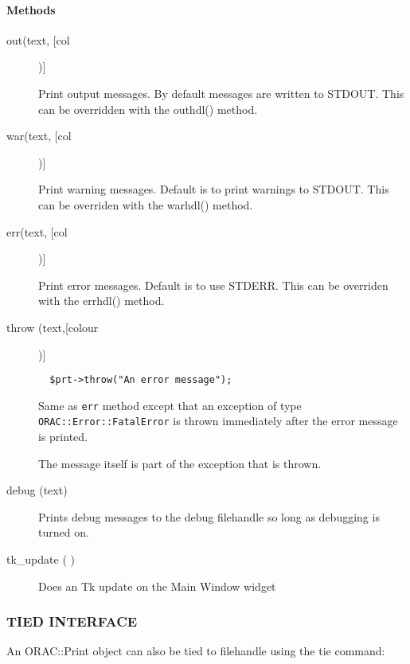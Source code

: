 \paragraph*{Methods\label{ORAC::Print_Methods}}
\begin{description}

\item[out(text, [col])] \mbox{}

Print output messages.
By default messages are written to STDOUT. This can be overridden with
the outhdl() method.


\item[war(text, [col])] \mbox{}

Print warning messages.
Default is to print warnings to STDOUT. This can be overriden with
the warhdl() method.


\item[err(text, [col])] \mbox{}

Print error messages.
Default is to use STDERR. This can be overriden with the errhdl()
method.


\item[throw (text,[colour])] \mbox{}\begin{verbatim}
  $prt->throw("An error message");
\end{verbatim}


Same as \texttt{err} method except that an exception of type
\texttt{ORAC::Error::FatalError} is thrown immediately after the error
message is printed.



The message itself is part of the exception that is thrown.


\item[debug (text)] \mbox{}

Prints debug messages to the debug filehandle so long as debugging
is turned on.


\item[tk\_update ( )] \mbox{}

Does an Tk update on the Main Window widget

\end{description}
\subsubsection*{TIED INTERFACE\label{ORAC::Print_TIED_INTERFACE}}


An ORAC::Print object can also be tied to filehandle using the
tie command:

